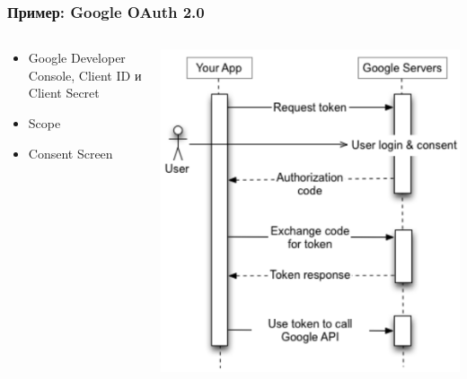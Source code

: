 \documentclass{../cscslides}
\begin{document}
    \begin{frame}
        \frametitle{Пример: Google OAuth 2.0}
        \begin{columns}
            \begin{column}{0.5\textwidth}
                \begin{itemize}
                    \item Google Developer Console, Client ID и Client Secret
                    \item Scope
                    \item Consent Screen
                \end{itemize}
            \end{column}
            \begin{column}{0.4\textwidth}
                \begin{center}
                    \includegraphics[width=\textwidth]{googleOAuth.png}
                \end{center}
            \end{column}
        \end{columns}
    \end{frame}
\end{document}
